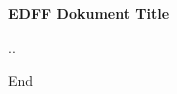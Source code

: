 \documentclass[10pt,a4paper]{article}
\begin{document}
\setlength{\parindent}{0pt}

\begin{center}
\huge
\vspace{1cm}

\textbf{EDFF Dokument Title}
\normalsize

\vspace{.5cm}
\the\day.\the\month.\the\year
\end{center}

\tableofcontents







\newpage %
\hspace{0pt}
\vfill
\centering
End
\vfill
\hspace{0pt}
\end{document}
